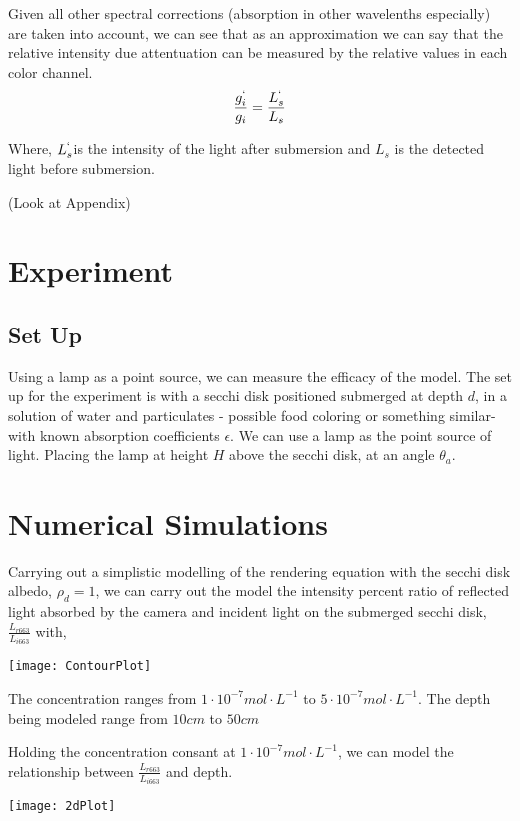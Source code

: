 \documentclass{article}
\begin{document}
Given all other spectral corrections (absorption in other wavelenths especially) are taken into account,
we can see that as an approximation we can say that the relative intensity due attentuation can be
measured by the relative values in each color channel.
\begin{align}
\frac{g_i^`}{g_i} = \frac{L^`_{s}}{L_{s}}
\end{align}

Where, $ L^`_{s}$is the intensity of the light after submersion and $ L_{s}$ is the detected light before submersion.

(Look at Appendix)
\section{Experiment}

\subsection{Set Up}
Using a lamp as a point source, we can measure the efficacy of the model. The set up for the experiment is
with a secchi disk positioned submerged at depth $d$, in a solution of water and particulates - possible food coloring
or something similar- with known absorption coefficients $ \epsilon$. We can use a lamp as the point source of light. Placing
the lamp at height $ H$ above the secchi disk, at an angle $\theta_a$.

\section{Numerical Simulations}

Carrying out a simplistic modelling of the rendering equation with the secchi disk albedo, $ \rho_d = 1$,
we can carry out the model the intensity percent ratio of reflected light absorbed by the camera and incident light on
the submerged secchi disk, $ \frac{L_{r663}}{L_{i 663}}$ with,
\begin{center}
    \texttt{[image: ContourPlot]}
\end{center}

The concentration ranges from $ 1 \cdot 10^{-7} mol\cdot L^{-1}$ to $5 \cdot 10^{-7} mol\cdot L^{-1}$. The depth being modeled
range from $10cm$ to $ 50cm$

Holding the concentration consant at $ 1 \cdot 10^{-7} mol\cdot L^{-1}$, we can model the
relationship between $ \frac{L_{r663}}{L_{i663}}$ and depth.
\begin{center}
    \texttt{[image: 2dPlot]}
\end{center}
\end{document}
